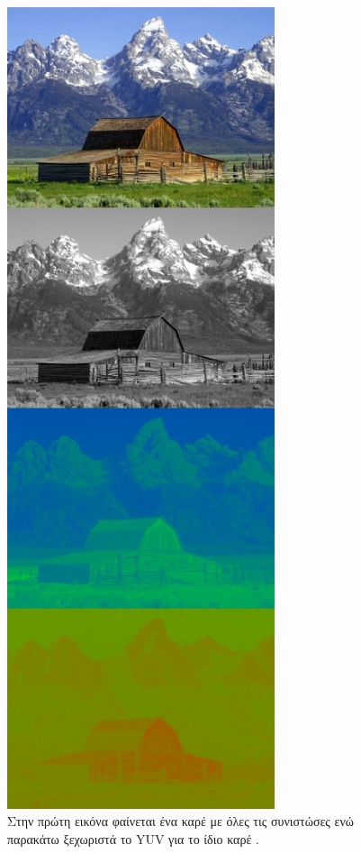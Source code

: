 \begin{figure}[H]
    \centering
        \includegraphics[totalheight=0.87\textheight,width=0.7\textwidth]{chapter2/yuv.jpg}
    \caption{Στην πρώτη εικόνα φαίνεται ένα καρέ με όλες τις συνιστώσες ενώ παρακάτω ξεχωριστά το YUV για το ίδιο καρέ \cite{wiki:yuv}.}
    \label{fig:yuv}
\end{figure}

